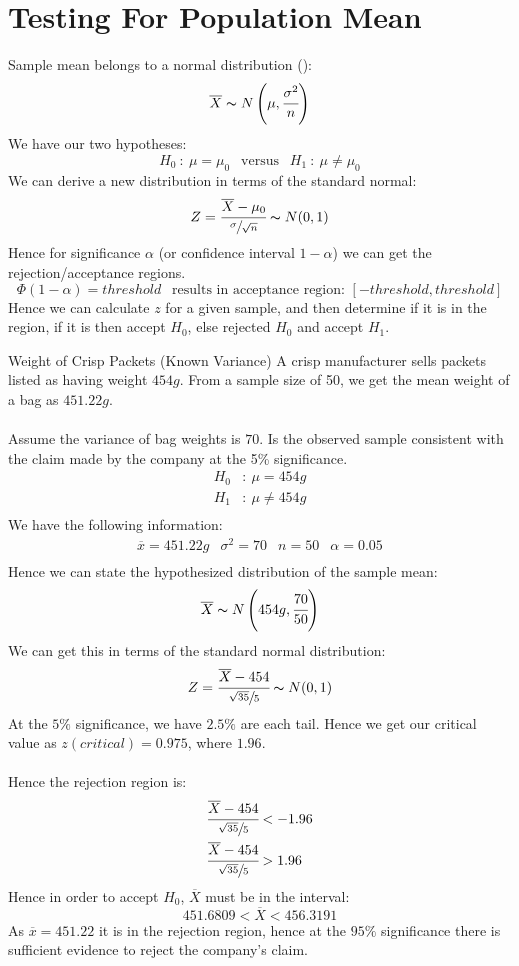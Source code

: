 \section{Testing For Population Mean}
Sample mean belongs to a normal distribution ():
\[\overline{X} \thicksim N\left( \mu, \cfrac{\sigma^2}{n}\right)\]
We have our two hypotheses:
\[H_0 \ : \ \mu = \mu_0 \ \ \text{  versus  } \ \ H_1 \ : \ \mu \neq \mu_0\]
We can derive a new distribution in terms of the standard normal:
\[Z = \cfrac{\overline{X} - \mu_0}{\sfrac{\sigma}{\sqrt{n}}} \thicksim N(0,1)\]
Hence for significance $\alpha$ (or confidence interval $1 - \alpha$) we can get the rejection/acceptance regions.
\[\Phi(1 - \alpha) = threshold \ \ \text{   results in acceptance region: } [-threshold, threshold] \]
Hence we can calculate $z$ for a given sample, and then determine if it is in the region, if it is then accept $H_0$, else rejected $H_0$ and accept $H_1$.
\begin{examplebox}{Weight of Crisp Packets (Known Variance)}
	A crisp manufacturer sells packets listed as having weight $454g$. From a sample size of 50, we get the mean weight of a bag as $451.22g$.
	\\
	\\ Assume the variance of bag weights is $70$. Is the observed sample consistent with the claim made by the company at the 5\% significance.
	\[\begin{split}
			H_0 &: \ \mu = 454g \\
			H_1 &: \ \mu \neq 454g \\
		\end{split}\]
	We have the following information:
	\[\begin{matrix}
			\overline{x} = 451.22g & \sigma^2 = 70 & n = 50 & \alpha = 0.05 \\
		\end{matrix}\]
	Hence we can state the hypothesized distribution of the sample mean:
	\[\overline{X} \thicksim N\left(454g, \cfrac{70}{50}\right)\]
	We can get this in terms of the standard normal distribution:
	\[Z = \cfrac{\overline{X} - 454}{\sfrac{\sqrt{35}}{5}} \thicksim N(0,1)\]
	At the $5\%$ significance, we have $2.5\%$ are each tail. Hence we get our critical value as $z(critical) = 0.975$, where $1.96$.
	\\
	\\ Hence the rejection region is:
	\[\begin{split}
			\cfrac{\overline{X} - 454}{\sfrac{\sqrt{35}}{5}} & < -1.96 \\
			\cfrac{\overline{X} - 454}{\sfrac{\sqrt{35}}{5}} & > 1.96 \\
		\end{split}\]
	Hence in order to accept $H_0$, $\overline{X}$ must be in the interval:
	\[451.6809 < \overline{X} < 456.3191\]
	As $\overline{x} = 451.22$ it is in the rejection region, hence at the $95\%$ significance there is sufficient evidence to reject the company's claim.
\end{examplebox}
